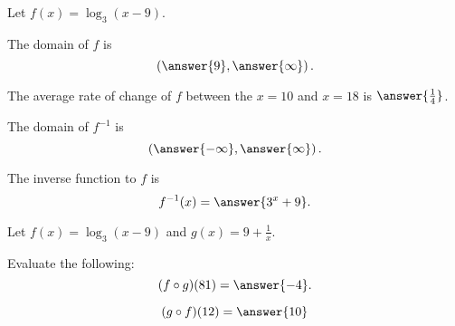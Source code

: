 \documentclass{ximera}
\author{Nela Lakos \and Kyle Parsons}
\begin{document}
\begin{exercise}

Let $\displaystyle{f(x) = \log_3(x-9)}$.

The domain of $f$ is
\[
\left(\answer{9},\answer{\infty}\right).
\]

The average rate of change of $f$ between the $x=10$ and $x=18$ is $\answer{\frac{1}{4}}$.

The domain of $f^{-1}$ is
\[
\left(\answer{-\infty},\answer{\infty}\right).
\]

The inverse function to $f$ is 
\[
f^{-1}(x) = \answer{3^x + 9}.
\]

\begin{exercise}

Let $f(x) = \log_3(x-9)$ and $g(x) = 9 + \frac{1}{x}$.

Evaluate the following:
\[
(f\circ g)(81) = \answer{-4}.
\]

\[
(g\circ f)(12) = \answer{10}
\]

\end{exercise}
\end{exercise}
\end{document}

